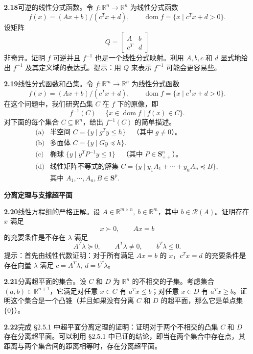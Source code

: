 \documentclass[UTF8, 12pt, fontset=fandol, oneside]{ctexart}
\begin{document}
\noindent\textbf{2.18}\quad 可逆的线性分式函数。令 $f:\mathbb{R}^n\to\mathbb{R}^n$ 为线性分式函数
\[
  f(x)=(Ax+b)/(c^Tx+d),\qquad \operatorname{dom}f=\{x\mid c^Tx+d>0\}.
\]
设矩阵
\[
  Q=\begin{bmatrix} A & b\\ c^T & d \end{bmatrix}
\]
非奇异。证明 $f$ 可逆并且 $f^{-1}$ 也是一个线性分式映射。利用 $A,b,c$ 和 $d$ 显式地给出 $f^{-1}$ 及其定义域的表达式。提示：用 $Q$ 来表示 $f^{-1}$ 可能会更容易些。

\noindent\textbf{2.19}\quad 线性分式函数和凸集。令 $f:\mathbb{R}^m\to\mathbb{R}^n$ 为线性分式函数
\[
  f(x)=(Ax+b)/(c^Tx+d),\qquad \operatorname{dom}f=\{x\mid c^Tx+d>0\}.
\]
在这个问题中，我们研究凸集 $C$ 在 $f$ 下的原像，即
\[
  f^{-1}(C)=\{x\in\operatorname{dom}f\mid f(x)\in C\}.
\]
对下面的每个集合 $C\subseteq\mathbb{R}^n$，给出 $f^{-1}(C)$ 的简单描述。
\[
  \begin{array}{ll}
  \text{(a)} & \text{半空间 }C=\{y\mid g^Ty\le h\}\quad \text{（其中 }g\ne0\text{）。}\\
  \text{(b)} & \text{多面体 }C=\{y\mid Gy\preceq h\}.\\
  \text{(c)} & \text{椭球 }\{y\mid y^TP^{-1}y\le1\}\quad \text{（其中 }P\in\mathbf{S}_{++}^n\text{）。}\\
  \text{(d)} & \text{线性矩阵不等式的解集 }C=\{y\mid y_1A_1+\cdots+y_nA_n\preceq B\},\\
  & \text{其中 }A_1,\cdots,A_n,B\in\mathbf{S}^p.
  \end{array}
\]

\noindent\textbf{分离定理与支撑超平面}

\noindent\textbf{2.20}\quad 线性方程组的严格正解。设 $A\in\mathbb{R}^{m\times n},\ b\in\mathbb{R}^m$，其中 $b\in\mathcal{R}(A)$。证明存在 $x$ 满足
\[
  x\succ0,\qquad Ax=b
\]
的充要条件是不存在 $\lambda$ 满足
\[
  A^T\lambda\succeq0,\qquad A^T\lambda\ne0,\qquad b^T\lambda\le0.
\]
提示：首先由线性代数证明：对于所有满足 $Ax=b$ 的 $x$，$c^Tx=d$ 的充要条件是存在向量 $\lambda$ 满足 $c=A^T\lambda,\ d=b^T\lambda$。

\noindent\textbf{2.21}\quad 分离超平面的集合。设 $C$ 和 $D$ 为 $\mathbb{R}^n$ 的不相交的子集。考虑集合 $(a,b)\in\mathbb{R}^{n+1}$，它满足对任意 $x\in C$ 有 $a^Tx\le b$；对任意 $x\in D$ 有 $a^Tx\ge b$。证明这个集合是一个凸锥（并且如果没有分离 $C$ 和 $D$ 的超平面，那么它是单点集 $\{0\}$）。

\noindent\textbf{2.22}\quad 完成 \S2.5.1 中超平面分离定理的证明：证明对于两个不相交的凸集 $C$ 和 $D$ 存在分离超平面。可以利用 \S2.5.1 中已证的结论，即当在两个集合中存在点，其距离与两个集合间的距离相等时，存在分离超平面。
\end{document}
